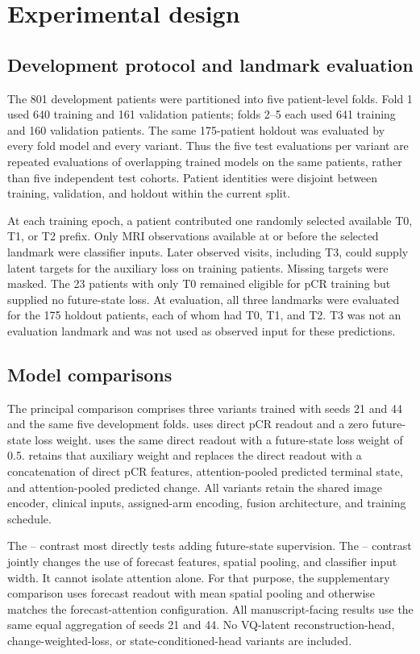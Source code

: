 \section{Experimental design}
\label{sec:experiments}
\subsection{Development protocol and landmark evaluation}
The 801 development patients were partitioned into five patient-level folds. Fold 1 used 640 training and 161 validation patients; folds 2--5 each used 641 training and 160 validation patients. The same 175-patient holdout was evaluated by every fold model and every variant. Thus the five test evaluations per variant are repeated evaluations of overlapping trained models on the same patients, rather than five independent test cohorts. Patient identities were disjoint between training, validation, and holdout within the current split.

At each training epoch, a patient contributed one randomly selected available T0, T1, or T2 prefix. Only MRI observations available at or before the selected landmark were classifier inputs. Later observed visits, including T3, could supply latent targets for the auxiliary loss on training patients. Missing targets were masked. The 23 patients with only T0 remained eligible for pCR training but supplied no future-state loss. At evaluation, all three landmarks were evaluated for the 175 holdout patients, each of whom had T0, T1, and T2. T3 was not an evaluation landmark and was not used as observed input for these predictions.

\subsection{Model comparisons}
The principal comparison comprises three variants trained with seeds 21 and 44 and the same five development folds. \nojepa{} uses direct pCR readout and a zero future-state loss weight. \direct{} uses the same direct readout with a future-state loss weight of 0.5. \fullmodel{} retains that auxiliary weight and replaces the direct readout with a concatenation of direct pCR features, attention-pooled predicted terminal state, and attention-pooled predicted change. All variants retain the shared image encoder, clinical inputs, assigned-arm encoding, fusion architecture, and training schedule.

The \direct{}--\nojepa{} contrast most directly tests adding future-state supervision. The \fullmodel{}--\direct{} contrast jointly changes the use of forecast features, spatial pooling, and classifier input width. It cannot isolate attention alone. For that purpose, the supplementary \meanmodel{} comparison uses forecast readout with mean spatial pooling and otherwise matches the forecast-attention configuration. All manuscript-facing results use the same equal aggregation of seeds 21 and 44. No VQ-latent reconstruction-head, change-weighted-loss, or state-conditioned-head variants are included.

